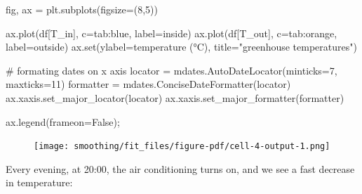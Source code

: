 \documentclass[
  letterpaper,
  DIV=11,
  numbers=noendperiod,
  oneside]{scrreprt}
\newenvironment{Shaded}{\begin{snugshade}}{\end{snugshade}}
\newcommand{\BuiltInTok}[1]{\textcolor[rgb]{0.00,0.23,0.31}{#1}}
\newcommand{\CommentTok}[1]{\textcolor[rgb]{0.37,0.37,0.37}{#1}}
\newcommand{\DecValTok}[1]{\textcolor[rgb]{0.68,0.00,0.00}{#1}}
\newcommand{\NormalTok}[1]{\textcolor[rgb]{0.00,0.23,0.31}{#1}}
\newcommand{\OperatorTok}[1]{\textcolor[rgb]{0.37,0.37,0.37}{#1}}
\newcommand{\StringTok}[1]{\textcolor[rgb]{0.13,0.47,0.30}{#1}}
\newcommand{\VariableTok}[1]{\textcolor[rgb]{0.07,0.07,0.07}{#1}}
\begin{document}
\begin{Shaded}
\begin{Highlighting}[]
\NormalTok{fig, ax }\OperatorTok{=}\NormalTok{ plt.subplots(figsize}\OperatorTok{=}\NormalTok{(}\DecValTok{8}\NormalTok{,}\DecValTok{5}\NormalTok{))}

\NormalTok{ax.plot(df[}\StringTok{\textquotesingle{}T\_in\textquotesingle{}}\NormalTok{], c}\OperatorTok{=}\StringTok{\textquotesingle{}tab:blue\textquotesingle{}}\NormalTok{, label}\OperatorTok{=}\StringTok{\textquotesingle{}inside\textquotesingle{}}\NormalTok{)}
\NormalTok{ax.plot(df[}\StringTok{\textquotesingle{}T\_out\textquotesingle{}}\NormalTok{], c}\OperatorTok{=}\StringTok{\textquotesingle{}tab:orange\textquotesingle{}}\NormalTok{, label}\OperatorTok{=}\StringTok{\textquotesingle{}outside\textquotesingle{}}\NormalTok{)}
\NormalTok{ax.}\BuiltInTok{set}\NormalTok{(ylabel}\OperatorTok{=}\StringTok{\textquotesingle{}temperature (°C)\textquotesingle{}}\NormalTok{,}
\NormalTok{       title}\OperatorTok{=}\StringTok{"greenhouse temperatures"}\NormalTok{)}

\CommentTok{\# formating dates on x axis}
\NormalTok{locator }\OperatorTok{=}\NormalTok{ mdates.AutoDateLocator(minticks}\OperatorTok{=}\DecValTok{7}\NormalTok{, maxticks}\OperatorTok{=}\DecValTok{11}\NormalTok{)}
\NormalTok{formatter }\OperatorTok{=}\NormalTok{ mdates.ConciseDateFormatter(locator)}
\NormalTok{ax.xaxis.set\_major\_locator(locator)}
\NormalTok{ax.xaxis.set\_major\_formatter(formatter)}

\NormalTok{ax.legend(frameon}\OperatorTok{=}\VariableTok{False}\NormalTok{)}\OperatorTok{;}
\end{Highlighting}
\end{Shaded}

\begin{figure}[H]

{\centering \texttt{[image: smoothing/fit\_files/figure-pdf/cell-4-output-1.png]}

}

\end{figure}

Every evening, at 20:00, the air conditioning turns on, and we see a
fast decrease in temperature:
\end{document}
